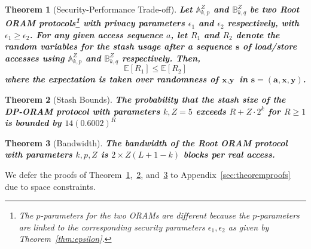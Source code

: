 \documentclass[USenglish,oneside,twocolumn]{article}
\makeatletter
\newtheorem{theorem}{Theorem}
\newcommand{\ourprotocol}{Root ORAM}
\let\origsubsection\subsection
\renewcommand\subsection{\@ifstar{\starsubsection}{\nostarsubsection}}
\newcommand\nostarsubsection[1]
{\subsectionprelude\origsubsection{#1}\subsectionpostlude}
\newcommand\starsubsection[1]
{\subsectionprelude\origsubsection*{#1}\subsectionpostlude}
\newcommand\subsectionprelude{\vspace{-1.5em}}
\newcommand\subsectionpostlude{\vspace{-1em}}
\makeatother
\begin{document}
\subsection{Performance Results}\label{subsec:performanceresults}

\begin{theorem}[Security-Performance Trade-off]\label{thm:DPhelps}
\textbf{Let $\mathbb{A}_{k,p}^Z$ and $\mathbb{B}_{k,q}^Z$ be two \ourprotocol{} protocols\footnote{The $p$-parameters for the two ORAMs are different because the $p$-parameters are linked to the corresponding security parameters $\epsilon_1, \epsilon_2$ as given by Theorem~\ref{thm:epsilon}.} with privacy parameters $\epsilon_1$ and $\epsilon_2$ respectively, with $\epsilon_1 \geq \epsilon_2$. For any given access sequence $a$, let $R_1$ and $R_2$ denote the random variables for the stash usage after a sequence $\textbf{s}$ of load/store accesses using $\mathbb{A}_{k,p}^Z$ and $\mathbb{B}_{k,q}^Z$ respectively. Then, 
\begin{equation}
\mathbb{E}[R_1]\leq \mathbb{E}[R_2]
\end{equation} 
where the expectation is taken over randomness of $\textbf{x}, \textbf{y}$ in $\textbf{s} = (\textbf{a}, \textbf{x}, \textbf{y})$.}
\end{theorem}


\begin{theorem}[Stash Bounds]\label{thm:stashbounds}
\textbf{The probability that the stash size of the DP-ORAM protocol with parameters $k, Z = 5$ exceeds $R + Z \cdot 2^k$ for $R \geq 1$ is bounded by $14 (0.6002)^R$}
\end{theorem}


\begin{theorem}[Bandwidth]\label{thm:bandwidth}
\textbf{The bandwidth of the \ourprotocol{} protocol with parameters $k,p,Z$ is $2 \times Z(L + 1 - k)$ blocks per real access.}
\end{theorem}


We defer the proofs of Theorem~\ref{thm:DPhelps},~\ref{thm:stashbounds}, and~\ref{thm:bandwidth} to Appendix~\ref{sec:theoremproofs} due to space constraints. 
\end{document}
